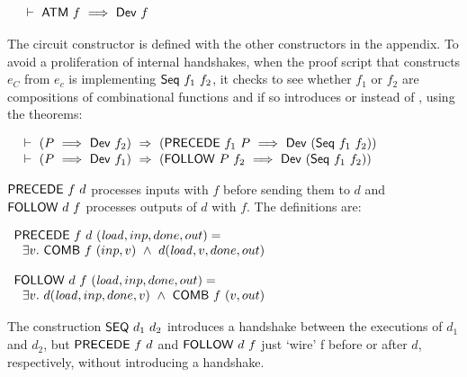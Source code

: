 \vspace*{-4mm}
$$\begin{array}{l}
~\vdash\ \mathsf{ATM}\ f\ \Longrightarrow \  \mathsf{Dev}\ f\\
\phantom{~~~~~~~~~~~~~~~~~~~~~~~~~~~~~~~~~~~~~~~~~~~~~~~~~~~~~~~~~~~~~~~~~~~~~~~~~~~~~~~~~~~~~~~~~~~~~~~~~~~~~}\\[-4mm]
\end{array}$$

\noindent The circuit constructor  is defined with the other constructors in the appendix.
To avoid a proliferation  of internal handshakes, when the proof script that constructs $e_C$ from $e_c$ 
is implementing $\mathsf{Seq}~f_1~f_2$, it checks to see whether $f_1$ or $f_2$ 
are compositions of combinational functions and if so introduces  or  instead of ,
using the theorems:

\vspace*{-4mm}
$$\begin{array}{l}
~\vdash\
      (P\ \Longrightarrow\ \mathsf{Dev}~f_2)~\Rightarrow~(\mathsf{PRECEDE}~f_1~P\ \Longrightarrow\ \mathsf{Dev}\ (\mathsf{Seq}~f_1~f_2))\\
\phantom{~~~~~~~~~~~~~~~~~~~~~~~~~~~~~~~~~~~~~~~~~~~~~~~~~~~~~~~~~~~~~~~~~~~~~~~~~~~~~~~~~~~~~~~~~~~~~~~~~~~~~~}\\[-4mm]
~\vdash\
(P\ \Longrightarrow\ \mathsf{Dev}~f_1)~\Rightarrow~(\mathsf{FOLLOW}~P~f_2\  \Longrightarrow\ \mathsf{Dev}\ (\mathsf{Seq}~f_1~f_2))\\
\end{array}$$


\noindent $\mathsf{PRECEDE}~f~d$ processes inputs with $f$ before sending them to $d$ and
$\mathsf{FOLLOW}~d~f$ processes outputs of $d$ with
$f$. The definitions are:

\vspace*{3mm}

$\begin{array}{l}
\mathsf{PRECEDE}~f~d~(\mathit{load},inp,done,out)  =\\
~~ \exists v.~ \mathsf{COMB}~f~(inp,v) ~\wedge~ d(\mathit{load},v,done,out)\\
 \\
\mathsf{FOLLOW}~d~f~ (\mathit{load},inp,done,out)  =\\
~~ \exists v.~d(\mathit{load},inp,done,v) ~\wedge~ \mathsf{COMB}~f~(v,out)
\end{array}$
\vspace*{3mm}

The construction $\mathsf{SEQ}~d_1~d_2$ introduces a handshake between the executions
of $d_1$ and $d_2$, but $\mathsf{PRECEDE}~f~d$ and $\mathsf{FOLLOW}~d~f$
just `wire' f before or after $d$, respectively, without introducing a
handshake. 

